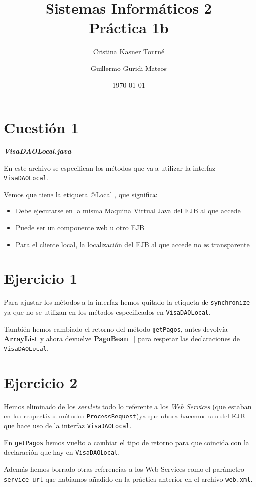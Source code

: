 \documentclass[a4paper, 10pt]{article}
\title{Sistemas Informáticos 2\\Práctica 1b}
\author{Cristina Kasner Tourné\and Guillermo Guridi Mateos}
\date{\today}
\begin{document}
\maketitle
\newpage

\section{Cuestión 1}\textit{\textbf{VisaDAOLocal.java}}


En este archivo se especifican los métodos que va a utilizar la interfaz \texttt{VisaDAOLocal}.


Vemos que tiene la etiqueta @Local , que significa:
\begin{itemize}
	\item Debe ejecutarse en la misma Maquina Virtual Java del EJB al que accede
	\item Puede ser un componente web u otro EJB
	\item Para el cliente local, la localización del EJB al que accede no es transparente
\end{itemize}

\section{Ejercicio 1}

Para ajustar los métodos a la interfaz hemos quitado la etiqueta de \texttt{synchronize} ya que no se utilizan en los métodos especificados en \texttt{VisaDAOLocal}.

También hemos cambiado el retorno del método \texttt{getPagos}, antes devolvía \textbf{ArrayList} y ahora devuelve \textbf{PagoBean []} para respetar las declaraciones de \texttt{VisaDAOLocal}.

\section{Ejercicio 2}
Hemos eliminado de los \textit{servlets} todo lo referente a los \textit{Web Services} (que estaban en los respectivos métodos \texttt{ProcessRequest})ya que ahora hacemos uso del EJB que hace uso de la interfaz \texttt{VisaDAOLocal}.

En \texttt{getPagos} hemos vuelto a cambiar el tipo de retorno para que coincida con la declaración que hay en \texttt{VisaDAOLocal}.

Además hemos borrado otras referencias a los Web Services como el parámetro \texttt{service-url} que habíamos añadido en la práctica anterior en el archivo \texttt{web.xml}.
\end{document}
